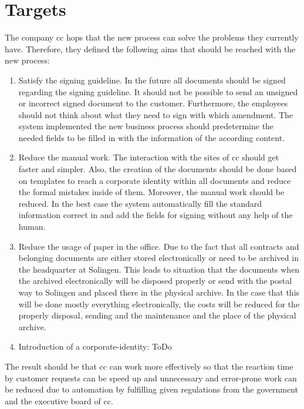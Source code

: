 \section{Targets}
The company \gls{cc} hops that the new process can solve the problems they currently have. Therefore, they defined the following aims that should be reached with the new process:
\begin{enumerate}
	\item Satisfy the signing guideline. \newline
	In the future all documents should be signed regarding the signing guideline. It should not be possible to send an unsigned or incorrect signed document to the customer. Furthermore, the employees should not think about what they need to sign with which amendment. The system implemented the new business process should predetermine the needed fields to be filled in with the information of the according content.
	\item Reduce the manual work. \newline
	The interaction with the sites of \gls{cc} should get faster and simpler. Also, the creation of the documents should be done based on templates to reach a corporate identity within all documents and reduce the formal mistakes inside of them. Moreover, the manual work should be reduced. In the best case the system automatically fill the standard information correct in and add the fields for signing without any help of the human.  
	\item Reduce the usage of paper in the office. \newline
	Due to the fact that all contracts and belonging documents are either stored electronically or need to be archived in the headquarter at Solingen. This leads to situation that the documents when the archived electronically will be disposed properly or send with the postal way to Solingen and placed there in the physical archive. In the case that this will be done mostly everything electronically, the costs will be reduced for the properly disposal, sending and the maintenance and the place of the physical archive. 
	\item Introduction of a corporate-identity: \newline
	ToDo
\end{enumerate}
The result should be that \gls{cc} can work more effectively so that the reaction time by customer requests can be speed up and unnecessary and error-prone work can be reduced due to automation by fulfilling given regulations from the government and the executive board of \gls{cc}.

